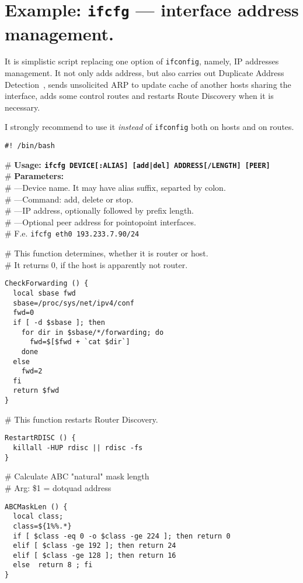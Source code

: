 \section{Example: {\protect\tt ifcfg} --- interface address management.}
\label{EXAMPLE-IFCFG}

It is simplistic script replacing one option of \verb|ifconfig|,
namely, IP addresses management. It not only adds
address, but also carries out Duplicate Address Detection~\cite{RFC-DHCP},
sends unsolicited ARP to update cache of another hosts sharing
the interface, adds some control routes and restarts Route Discovery
when it is necessary.

I strongly recommend to use it {\em instead\/} of \verb|ifconfig| both
on hosts and on routes.

\begin{verbatim}
#! /bin/bash
\end{verbatim}
\begin{flushleft}
\# {\bf Usage: \verb?ifcfg DEVICE[:ALIAS] [add|del] ADDRESS[/LENGTH] [PEER]?}\\
\# {\bf Parameters:}\\
\# ---Device name. It may have alias suffix, separted by colon.\\
\# ---Command: add, delete or stop.\\
\# ---IP address, optionally followed by prefix length.\\
\# ---Optional peer address for pointopoint interfaces.\\
\# F.e. \verb|ifcfg eth0 193.233.7.90/24|

\noindent\# This function determines, whether it is router or host.\\
\# It returns 0, if the host is apparently not router.
\end{flushleft}
\begin{verbatim}
CheckForwarding () {
  local sbase fwd
  sbase=/proc/sys/net/ipv4/conf
  fwd=0
  if [ -d $sbase ]; then
    for dir in $sbase/*/forwarding; do
      fwd=$[$fwd + `cat $dir`]
    done
  else
    fwd=2
  fi
  return $fwd
}
\end{verbatim}
\begin{flushleft}
\# This function restarts Router Discovery.\\
\end{flushleft}
\begin{verbatim}
RestartRDISC () {
  killall -HUP rdisc || rdisc -fs
}
\end{verbatim}
\begin{flushleft}
\# Calculate ABC "natural" mask length\\
\# Arg: \$1 = dotquad address
\end{flushleft}
\begin{verbatim}
ABCMaskLen () {
  local class;
  class=${1%%.*}
  if [ $class -eq 0 -o $class -ge 224 ]; then return 0
  elif [ $class -ge 192 ]; then return 24
  elif [ $class -ge 128 ]; then return 16
  else  return 8 ; fi
}
\end{verbatim}


